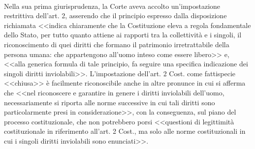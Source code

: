\\Nella sua prima giurisprudenza, la Corte aveva accolto un’impostazione restrittiva dell’art. 2, asserendo che il principio espresso dalla disposizione richiamata <<indica chiaramente che la Costituzione eleva a regola fondamentale dello Stato, per tutto quanto attiene ai rapporti tra la collettività e i singoli, il riconoscimento di quei diritti che formano il patrimonio irretrattabile della persona umana: che appartengono all’uomo inteso come essere libero>> e, <<alla generica formula di tale principio, fa seguire una specifica indicazione dei singoli diritti inviolabili>>.
L’impostazione dell’art. 2 Cost. come fattispecie <<chiusa>> è facilmente riconoscibile anche in altre pronunce in cui si afferma che <<nel riconoscere e garantire in genere i diritti inviolabili dell’uomo, necessariamente si riporta alle norme successive in cui tali diritti sono particolarmente presi in considerazione>>, con la conseguenza, sul piano del processo costituzionale, che non potrebbero porsi <<questioni di legittimità costituzionale in riferimento all’art. 2 Cost., ma solo alle norme costituzionali in cui i singoli diritti inviolabili sono enunciati>>.
